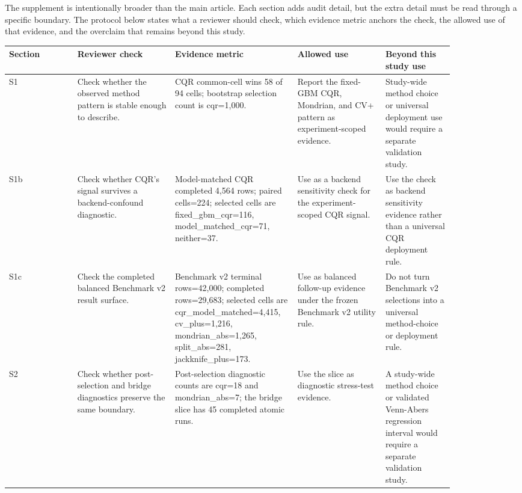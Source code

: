 \documentclass[11pt]{article}
\begin{document}
The supplement is intentionally broader than the main article. Each section adds audit detail, but the extra detail must be read through a specific boundary. The protocol below states what a reviewer should check, which evidence metric anchors the check, the allowed use of that evidence, and the overclaim that remains beyond this study.

\begingroup
\footnotesize
\setlength{\tabcolsep}{2pt}
\renewcommand{\arraystretch}{1.18}
\begin{tabular}{@{}>{\RaggedRight\arraybackslash}p{0.140\linewidth}>{\RaggedRight\arraybackslash}p{0.200\linewidth}>{\RaggedRight\arraybackslash}p{0.200\linewidth}>{\RaggedRight\arraybackslash}p{0.180\linewidth}>{\RaggedRight\arraybackslash}p{0.140\linewidth}@{}}
\toprule
Section & Reviewer check & Evidence metric & Allowed use & Beyond this study use \\
\midrule
S1 & Check whether the observed method pattern is stable enough to describe. & CQR common-cell wins 58 of 94 cells; bootstrap selection count is cqr=1,000. & Report the fixed-GBM CQR, Mondrian, and CV+ pattern as experiment-scoped evidence. & Study-wide method choice or universal deployment use would require a separate validation study. \\
S1b & Check whether CQR's signal survives a backend-confound diagnostic. & Model-matched CQR completed 4,564 rows; paired cells=224; selected cells are fixed\_\allowbreak{}gbm\_\allowbreak{}cqr=116, model\_\allowbreak{}matched\_\allowbreak{}cqr=71, neither=37. & Use as a backend sensitivity check for the experiment-scoped CQR signal. & Use the check as backend sensitivity evidence rather than a universal CQR deployment rule. \\
S1c & Check the completed balanced Benchmark v2 result surface. & Benchmark v2 terminal rows=42,000; completed rows=29,683; selected cells are cqr\_\allowbreak{}model\_\allowbreak{}matched=4,415, cv\_\allowbreak{}plus=1,216, mondrian\_\allowbreak{}abs=1,265, split\_\allowbreak{}abs=281, jackknife\_\allowbreak{}plus=173. & Use as balanced follow-up evidence under the frozen Benchmark v2 utility rule. & Do not turn Benchmark v2 selections into a universal method-choice or deployment rule. \\
S2 & Check whether post-selection and bridge diagnostics preserve the same boundary. & Post-selection diagnostic counts are cqr=18 and mondrian\_\allowbreak{}abs=7; the bridge slice has 45 completed atomic runs. & Use the slice as diagnostic stress-test evidence. & A study-wide method choice or validated Venn-Abers regression interval would require a separate validation study. \\

\end{tabular}
\end{document}
